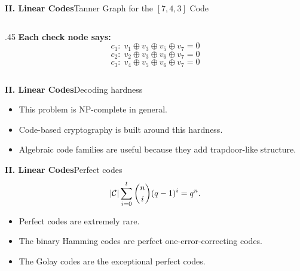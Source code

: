 \begin{frame}{\textbf{II. Linear Codes}}{Tanner Graph for the $[7,4,3]$ Code}
\begin{columns}[T,onlytextwidth]
\begin{column}{.45\textwidth}
    \medskip
    \textcolor{TealDarkCyan}{\textbf{Each check node says:}}
    \[
      c_1{:}\; v_1 \oplus v_3 \oplus v_5 \oplus v_7 = 0
    \]
    \[
      c_2{:}\; v_2 \oplus v_3 \oplus v_6 \oplus v_7 = 0
    \]
    \[
      c_3{:}\; v_4 \oplus v_5 \oplus v_6 \oplus v_7 = 0
    \]

  \end{column}
\end{columns}
\end{frame}

\begin{frame}{\textbf{II. Linear Codes}}{Decoding hardness}
\small
{}
\begin{itemize}
  \item This problem is NP-complete in general.
  \item Code-based cryptography is built around this hardness.
  \item Algebraic code families are useful because they add trapdoor-like structure.
\end{itemize}
\end{frame}

\begin{frame}{\textbf{II. Linear Codes}}{Perfect codes}
\small
{}
\[
  |\mathcal{C}|\sum_{i=0}^t \binom{n}{i}(q-1)^i=q^n.
\]
\begin{itemize}
  \item Perfect codes are extremely rare.
  \item The binary Hamming codes are perfect one-error-correcting codes.
  \item The Golay codes are the exceptional perfect codes.
\end{itemize}
\end{frame}


